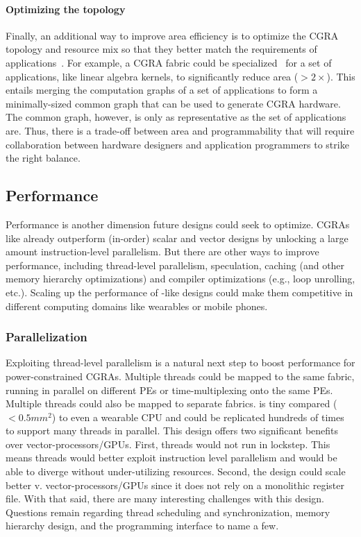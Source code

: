 \paragraph{Optimizing the topology}
Finally, an additional way to improve area efficiency is to optimize the CGRA topology and resource mix so that they better match the requirements of applications~\cite{revamp,melchert2021automated}.
% 
For example, a CGRA fabric could be specialized~\cite{weng2020dsagen} for a set of applications, like linear algebra kernels, to significantly reduce area ($>2\times$).
% 
This entails merging the computation graphs of a set of applications to form a minimally-sized common graph that can be used to generate CGRA hardware.
% 
The common graph, however, is only as representative as the set of applications are.
% 
Thus, there is a trade-off between area and programmability that will require collaboration between hardware designers and application programmers to strike the right balance.

\subsection{Performance}
Performance is another dimension future designs could seek to optimize.
% 
CGRAs like \riptide already outperform (in-order) scalar and vector designs by unlocking a large amount instruction-level parallelism.
% 
But there are other ways to improve performance, including thread-level parallelism, speculation, caching (and other memory hierarchy optimizations) and compiler optimizations (e.g., loop unrolling, etc.).
% 
Scaling up the performance of \riptide-like designs could make them competitive in different computing domains like wearables or mobile phones.

\subsubsection{Parallelization}
Exploiting thread-level parallelism is a natural next step to boost performance for power-constrained CGRAs.
% 
Multiple threads could be mapped to the same fabric, running in parallel on different PEs or time-multiplexing onto the same PEs.
%
Multiple threads could also be mapped to separate fabrics. 
% 
\riptide is tiny compared ($<0.5mm^2$) to even a wearable CPU and could be replicated hundreds of times to support many threads in parallel.
% 
This design offers two significant benefits over vector-processors/GPUs.
% 
First, threads would not run in lockstep.
This means threads would better exploit instruction level parallelism and would be able to diverge without under-utilizing resources.
Second, the design could scale better v. vector-processors/GPUs since it does not rely on a monolithic register file.
% 
With that said, there are many interesting challenges with this design.
% 
Questions remain regarding thread scheduling and synchronization, memory hierarchy design, and the programming interface to name a few.

